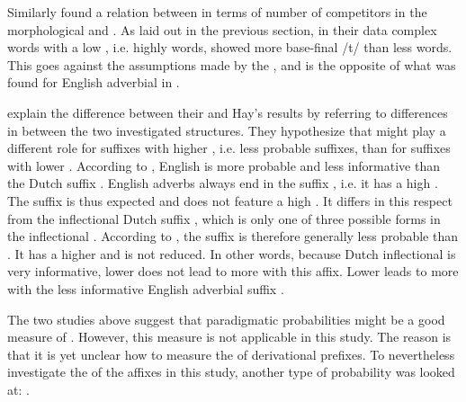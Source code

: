 {{  
 Similarly \cite{Schuppler.2012} found a relation between  in terms of number of competitors in the morphological  and . 
 As laid out in the previous section, in their data complex words with a low , i.e. highly  words, showed more base-final /t/  than less  words. This goes against the assumptions made by the , and is the opposite of what was found for English adverbial  in \cite{Hay.2003}. 
 
 \cite{Schuppler.2012} explain the difference between their and Hay's results by referring to differences in  between the two investigated structures. 
 They hypothesize that  might play a different role for suffixes with higher , i.e. less probable suffixes, than for suffixes with lower . According to \cite{Schuppler.2012}, English  is more probable and less informative than the Dutch suffix . 
 English adverbs always end in the suffix , i.e. it has a high . The suffix is thus expected and does not feature a high . It differs in this respect from the inflectional Dutch suffix , which is only one of three possible forms in the inflectional . According to \cite{Schuppler.2012}, the suffix  is therefore generally less probable than . It has a higher  and is not reduced. In other words, because Dutch inflectional  is very informative, lower  does not lead to more  with this affix. Lower  leads to more  with the less informative English adverbial suffix  .
 
 
The two studies above suggest that paradigmatic probabilities might be a good measure of . However, this measure is not applicable in this study. The reason is that it is yet unclear how to measure the  of derivational prefixes. 
 To nevertheless investigate the  of the affixes in this study, 
another type of probability was looked at: . 

}}
